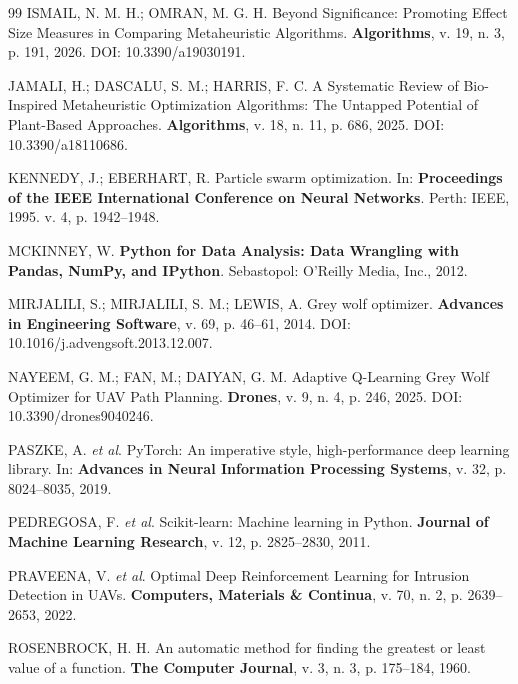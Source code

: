 \documentclass[12pt, a4paper, oneside]{report}
\begin{document}
\begin{flushleft}
\begin{thebibliography}{99}
ISMAIL, N. M. H.; OMRAN, M. G. H. Beyond Significance: Promoting Effect Size Measures in Comparing Metaheuristic Algorithms. \textbf{Algorithms}, v. 19, n. 3, p. 191, 2026. DOI: 10.3390/a19030191.

JAMALI, H.; DASCALU, S. M.; HARRIS, F. C. A Systematic Review of Bio-Inspired Metaheuristic Optimization Algorithms: The Untapped Potential of Plant-Based Approaches. \textbf{Algorithms}, v. 18, n. 11, p. 686, 2025. DOI: 10.3390/a18110686.

KENNEDY, J.; EBERHART, R. Particle swarm optimization. In: \textbf{Proceedings of the IEEE International Conference on Neural Networks}. Perth: IEEE, 1995. v. 4, p. 1942--1948.

MCKINNEY, W. \textbf{Python for Data Analysis: Data Wrangling with Pandas, NumPy, and IPython}. Sebastopol: O'Reilly Media, Inc., 2012.

MIRJALILI, S.; MIRJALILI, S. M.; LEWIS, A. Grey wolf optimizer. \textbf{Advances in Engineering Software}, v. 69, p. 46--61, 2014. DOI: 10.1016/j.advengsoft.2013.12.007.

NAYEEM, G. M.; FAN, M.; DAIYAN, G. M. Adaptive Q-Learning Grey Wolf Optimizer for UAV Path Planning. \textbf{Drones}, v. 9, n. 4, p. 246, 2025. DOI: 10.3390/drones9040246.

PASZKE, A. \textit{et al}. PyTorch: An imperative style, high-performance deep learning library. In: \textbf{Advances in Neural Information Processing Systems}, v. 32, p. 8024--8035, 2019.

PEDREGOSA, F. \textit{et al}. Scikit-learn: Machine learning in Python. \textbf{Journal of Machine Learning Research}, v. 12, p. 2825--2830, 2011.

PRAVEENA, V. \textit{et al}. Optimal Deep Reinforcement Learning for Intrusion Detection in UAVs. \textbf{Computers, Materials \& Continua}, v. 70, n. 2, p. 2639--2653, 2022.

ROSENBROCK, H. H. An automatic method for finding the greatest or least value of a function. \textbf{The Computer Journal}, v. 3, n. 3, p. 175--184, 1960.


\end{thebibliography}
\end{flushleft}
\end{document}
